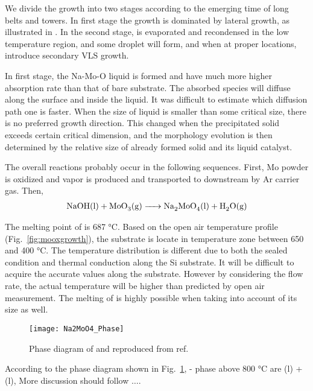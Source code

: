 We divide the growth into two stages according to the emerging time of long belts and towers. In first stage the growth is dominated by lateral growth, as illustrated in . In the second stage,  is evaporated and recondensed in the low temperature region, and some droplet will form, and when at proper locations, introduce secondary VLS growth.

In first stage, the Na-Mo-O liquid is formed and have much more higher absorption rate than that of bare substrate. The absorbed species will diffuse along the surface and inside the liquid. It was difficult to estimate which diffusion path one is faster. When the size of liquid is smaller than some critical size, there is no preferred growth direction. This changed when the precipitated solid exceeds certain critical dimension, and the morphology evolution is then determined by the relative size of already formed solid and its liquid catalyst.


The overall reactions probably occur in the following sequences.
First, Mo powder is oxidized and  vapor is produced and transported to downstream by Ar carrier gas. Then,
\begin{align}
\cee{NaOH(l) + MoO3(g) -> Na2MoO4(l) + H2O(g)}
\end{align}

The melting point of  is 687 \si{\degreeCelsius}. Based on the open air temperature profile (Fig.~\ref{fig:mooxgrowth}), the substrate is locate in temperature zone between 650 and 400 \si{\degreeCelsius}. The temperature distribution is different due to both the sealed condition and thermal conduction along the Si substrate. It will be difficult to acquire the accurate values along the substrate. However by considering the flow rate, the actual temperature will be higher than predicted by open air measurement.\cite{Subannajui2010} The melting of  is highly possible when taking into account of its size as well. \cite{Bruggemann1997}

\begin{figure}[htb]
\centering
\texttt{[image: Na2MoO4\_Phase]}
\caption[Phase diagram of Na-Mo-O system]{Phase diagram of  and  reproduced from ref.~\cite{Hoermann1929}}
\label{fig:pd}
\end{figure}

According to the phase diagram shown in Fig.~\ref{fig:pd},  -  phase above 800 \si{\degreeCelsius} are (l) + (l), More discussion should follow $\ldots$.

